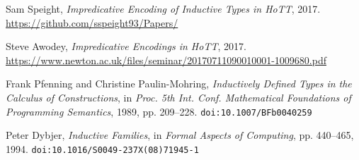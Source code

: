 \documentclass{article}
\theoremstyle{definition}
\begin{document}
\begin{thebibliography}{99}

Sam Speight,
\textit{Impredicative Encoding of Inductive Types in HoTT},
2017.
\url{https://github.com/sspeight93/Papers/}

Steve Awodey,
\textit{Impredicative Encodings in HoTT},
2017.
\url{https://www.newton.ac.uk/files/seminar/20170711090010001-1009680.pdf}

Frank Pfenning and Christine Paulin-Mohring,
\textit{Inductively Defined Types in the Calculus of Constructions},
in \textit{Proc. 5th Int. Conf. Mathematical Foundations of Programming Semantics}, 1989, pp. 209–228.
\texttt{doi:10.1007/BFb0040259}

Peter Dybjer,
\textit{Inductive Families},
in \textit{Formal Aspects of Computing},
pp. 440–465, 1994.
\texttt{doi:10.1016/S0049-237X(08)71945-1}

\end{thebibliography}
\end{document}
